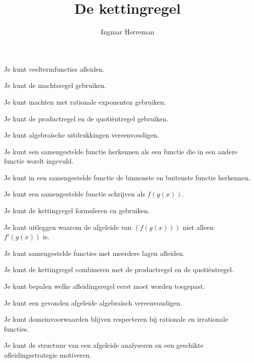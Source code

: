 \documentclass{ximera}
\title{De kettingregel}
\author{Ingmar Herreman}
\begin{document}






\maketitle



\begin{voorkennis}
  \item Je kunt veeltermfuncties afleiden.
  \item Je kunt de machtsregel gebruiken.
  \item Je kunt machten met rationale exponenten gebruiken.
  \item Je kunt de productregel en de quotiëntregel gebruiken.
  \item Je kunt algebraïsche uitdrukkingen vereenvoudigen.
  \item Je kunt een samengestelde functie herkennen als een functie
        die in een andere functie wordt ingevuld.
\end{voorkennis}

\begin{leerdoelen}
  \item Je kunt in een samengestelde functie de binnenste en buitenste
        functie herkennen.
  \item Je kunt een samengestelde functie schrijven als $f(g(x))$.
  \item Je kunt de kettingregel formuleren en gebruiken.
  \item Je kunt uitleggen waarom de afgeleide van $(f(g(x)))$
        niet alleen $f'(g(x))$ is.
  \item Je kunt samengestelde functies met meerdere lagen afleiden.
  \item Je kunt de kettingregel combineren met de productregel en
        de quotiëntregel.
  \item Je kunt bepalen welke afleidingsregel eerst moet worden toegepast.
  \item Je kunt een gevonden afgeleide algebraïsch vereenvoudigen.
  \item Je kunt domeinvoorwaarden blijven respecteren bij rationale
        en irrationale functies.
  \item Je kunt de structuur van een afgeleide analyseren en een
        geschikte afleidingsstrategie motiveren.
\end{leerdoelen}
\end{document}

